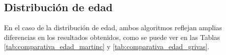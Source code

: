\bigskip
\begin{table}[H]
	\centering
	\caption{Distribución de género obtenida por ambos algoritmos}
	\label{tab:comparativa_genero}
\end{table}

\subsection{Distribución de edad}
\label{subsec:casouso_analisis_edad}

En el caso de la distribución de edad, ambos algoritmos reflejan amplias diferencias en los resultados obtenidos, como se puede
ver en las Tablas \ref{tab:comparativa_edad_martinc} y \ref{tab:comparativa_edad_grivas}.

